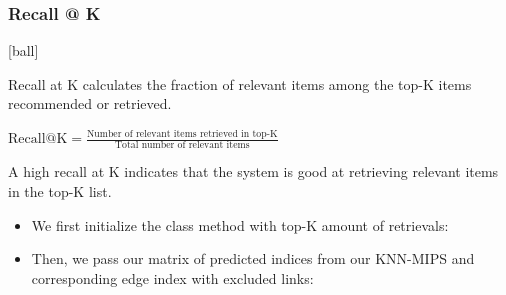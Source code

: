 \documentclass{beamer}
\begin{document}
\begin{frame}[fragile]
\begin{itemize}
\frametitle{Recall @ K}
[ball]

\item Recall at K calculates the fraction of relevant items among the top-K items recommended or retrieved.

\vspace{0.5cm}

\begin{center}
    \item[] $\text{Recall@K} = \frac{\text{Number of relevant items retrieved in top-K}}{\text{Total number of relevant items}}$
\end{center}

\vspace{0.5cm}

\item A high recall at K indicates that the system is good at retrieving relevant items in the top-K list.

\end{itemize}
\end{frame}


\begin{frame}[fragile]
\begin{itemize}
\frametitle{Recall @ K: Code}

\item We first initialize the class method with top-K amount of retrievals:



\vspace{0.5cm}

\item Then, we pass our matrix of predicted indices from our KNN-MIPS and corresponding edge index with excluded links:



\end{itemize}
\end{frame}

\end{document}
